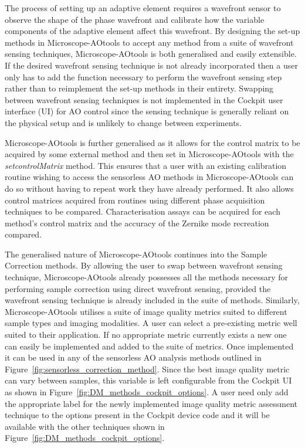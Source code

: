 The process of setting up an adaptive element requires a wavefront sensor 
to observe the shape of the phase wavefront and calibrate how the variable 
components of the adaptive element affect this wavefront. By designing the 
set-up methods in Microscope-AOtools to accept any method from a suite of 
wavefront sensing techniques, Microscope-AOtools is both generalised and 
easily extensible. If the desired wavefront sensing technique is not 
already incorporated then a user only has to add the function necessary to 
perform the wavefront sensing step rather than to reimplement the set-up 
methods in their entirety. Swapping between wavefront sensing techniques is 
not implemented in the Cockpit user interface (UI) for AO control since the 
sensing technique is generally reliant on the physical setup and is 
unlikely to change between experiments.

Microscope-AOtools is further generalised as it allows for the control 
matrix to be acquired by some external method and then set in 
Microscope-AOtools with the \textit{set\textunderscore controlMatrix} 
method. This ensures that a user with an existing calibration routine 
wishing to access the sensorless AO methods in Microscope-AOtools can do so 
without having to repeat work they have already performed. It also allows 
control matrices acquired from routines using different phase acquisition 
techniques to be compared. Characterisation assays can be acquired for each 
method's control matrix and the accuracy of the Zernike mode recreation 
compared.

The generalised nature of Microscope-AOtools continues into the Sample 
Correction methods. By allowing the user to swap between wavefront sensing 
technique, Microscope-AOtools already possesses all the methods necessary 
for performing sample correction using direct wavefront sensing, provided 
the wavefront sensing technique is already included in the suite of 
methods. Similarly, Microscope-AOtools utilises a suite of image quality 
metrics suited to different sample types and imaging modalities. A user can 
select a pre-existing metric well suited to their application. If no 
appropriate metric currently exists a new one can easily be implemented 
and added  to the suite of metrics. Once implemented it can be used in any 
of the sensorless AO analysis methods outlined in 
Figure~\ref{fig:sensorless_correction_method}. Since the best image quality 
metric can vary between samples, this variable is left configurable from 
the Cockpit UI as shown in Figure~\ref{fig:DM_methods_cockpit_options}. A 
user need only add the appropriate label for the newly implemented image 
quality metric assessment technique to the options present in the Cockpit 
device code and it will be available with the other techniques shown in 
Figure~\ref{fig:DM_methods_cockpit_options}.

